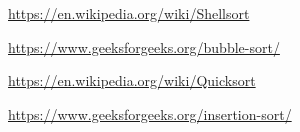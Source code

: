 \documentclass[journal]{IEEEtran}
\begin{document}
\ifCLASSOPTIONcaptionsoff
  \newpage
\fi
    

\begin{thebibliography}{1}
    \url{https://en.wikipedia.org/wiki/Shellsort} \par
{}
    \url{https://www.geeksforgeeks.org/bubble-sort/} \par
{}
    \url{https://en.wikipedia.org/wiki/Quicksort} \par
{}
    \url{https://www.geeksforgeeks.org/insertion-sort/} \par

\end{thebibliography}
\end{document}
